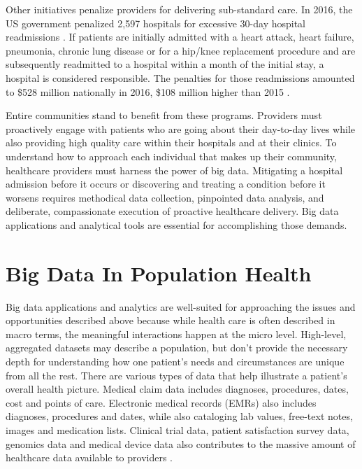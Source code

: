 \documentclass[sigconf]{acmart}
\begin{document}
 Other initiatives penalize providers for delivering sub-standard care. In 2016, the US government penalized 2,597 hospitals for excessive 30-day hospital readmissions \cite{editor05}. If patients are initially admitted with a heart attack, heart failure, pneumonia, chronic lung disease or for a hip/knee replacement procedure and are subsequently readmitted to a hospital within a month of the initial stay, a hospital is considered responsible. The penalties for those readmissions amounted to \$528 million nationally in 2016, \$108 million higher than 2015 \cite{editor05}.

 Entire communities stand to benefit from these programs. Providers must proactively engage with patients who are going about their day-to-day lives while also providing high quality care within their hospitals and at their clinics. To understand how to approach each individual that makes up their community, healthcare providers must harness the power of big data. Mitigating a hospital admission before it occurs or discovering and treating a condition before it worsens requires methodical data collection, pinpointed data analysis, and deliberate, compassionate execution of proactive healthcare delivery. Big data applications and analytical tools are essential for accomplishing those demands.

\section{Big Data In Population Health}

 Big data applications and analytics are well-suited for approaching the issues and opportunities described above because while health care is often described in macro terms, the meaningful interactions happen at the micro level. High-level, aggregated datasets may describe a population, but don't provide the necessary depth for understanding how one patient's needs and circumstances are unique from all the rest. There are various types of data that help illustrate a patient's overall health picture. Medical claim data includes diagnoses, procedures, dates, cost and points of care. Electronic medical records (EMRs) also includes diagnoses, procedures and dates, while also cataloging lab values, free-text notes, images and medication lists. Clinical trial data, patient satisfaction survey data, genomics data and medical device data also contributes to the massive amount of healthcare data available to providers \cite{editor14}. 
\end{document}
